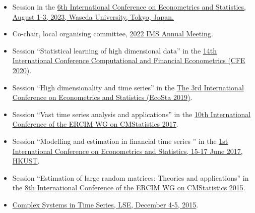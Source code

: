 \documentclass[overlapped,line,letterpaper]{res}
\begin{document}
\begin{resume}
\begin{itemize}
\item[$\bullet$] Session in the \href{http://www.cmstatistics.org/EcoSta2023/organized.php}{6th International Conference on Econometrics and Statistics, August 1-3, 2023, Waseda University, Tokyo, Japan.}

\item[$\bullet$] Co-chair, local organising committee, \href{https://www.imsannualmeeting-london2022.com/}{2022 IMS Annual Meeting}.

  \item[$\bullet$] Session ``Statistical learning of high dimensional data'' in the \href{http://www.cfenetwork.org/CFE2020/organized.php}{14th International Conference Computational and Financial Econometrics (CFE 2020)}.

  \item[$\bullet$] Session ``High dimensionality and time series'' in the \href{http://cmstatistics.org/EcoSta2019/index.php}{The 3rd International Conference on Econometrics and Statistics (EcoSta 2019)}.

  \item[$\bullet$] Session ``Vast time series analysis and applications'' in the \href{http://cmstatistics.org/CMStatistics2017/organized.php}{10th International Conference of the ERCIM WG on CMStatistics 2017}.

  \item[$\bullet$] Session ``Modelling and estimation in financial time series '' in the \href{http://cmstatistics.org/EcoSta2017/organized.php}{1st International Conference on Econometrics and Statistics, 15-17 June 2017, HKUST}.


  \item[$\bullet$] Session ``Estimation of large random matrices: Theories and applications'' in the \href{http://www.cmstatistics.org/CMStatistics2015/organized.php}{8th International Conference of the ERCIM WG on CMStatistics 2015}.

  \item[$\bullet$] \href{http://www.lse.ac.uk/statistics/events/SpecialEventsandConferences/Complex-Systems-in-Time-Series/main-page.aspx}
      {Complex Systems in Time Series, LSE, December 4-5, 2015}.
\end{itemize}



\end{resume}
\end{document}
